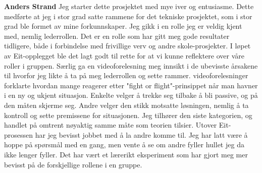 \textbf{Anders Strand}
Jeg starter dette prosjektet med mye iver og entusiasme. 
Dette medførte at jeg i stor grad satte rammene for det tekniske prosjektet, som i stor grad ble formet av mine forkunnskaper.
Jeg gikk i en rolle jeg er veldig kjent med, nemlig lederrollen. 
Det er en rolle som har gitt meg gode resultater tidligere, både i forbindelse med frivillige verv og andre skole-prosjekter.
I løpet av Eit-opplegget ble det lagt godt til rette for at vi kunne reflektere over våre roller i gruppen.
Særlig ga en videoforelesning meg innsikt i de ubevisste årsakene til hvorfor jeg likte å ta på meg lederrollen og sette rammer. 
videoforelesninger forklarte hvordan mange reagerer etter "fight or flight"-prinsippet når man havner i en ny og ukjent situasjon.
Enkelte velger å trekke seg tilbake å bli passive, og på den måten skjerme seg. 
Andre velger den stikk motsatte løsningen, nemlig å ta kontroll og sette premissene for situasjonen. 
Jeg tilhører den siste kategorien, og handlet på omtrent nøyaktig samme måte som teorien tilsier.
Utover Eit-prosessen har jeg bevisst jobbet med å la andre komme til.
Jeg har latt være å hoppe på spørsmål med en gang, men vente å se om andre fyller hullet jeg da ikke lenger fyller. Det har vært et lærerikt eksperiment som har gjort meg mer bevisst på de forskjellige rollene i en gruppe.

